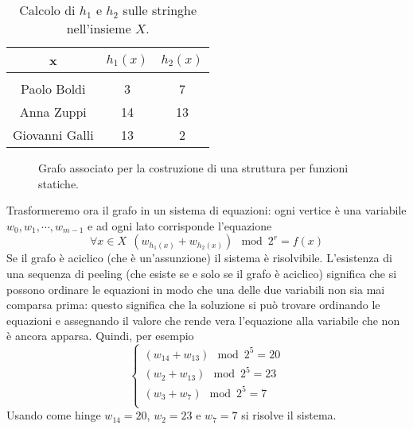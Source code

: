 \begin{table}[htpb]
	\begin{tabular}{c | c | c}
		x              & $h_1(x)$ & $h_2(x)$ \\
		\hline                               \\
		Paolo Boldi    & 3        & 7        \\
		Anna Zuppi     & 14       & 13       \\
		Giovanni Galli & 13       & 2
	\end{tabular}
	\centering
	\caption{Calcolo di $h_1$ e $h_2$ sulle stringhe nell'insieme $X$.}
	\label{tab:static_hashes}
\end{table}
\begin{figure}[htpb]
	\begin{center}

	\end{center}
	\caption{Grafo associato per la costruzione di una struttura per funzioni statiche.}%
	\label{fig:static_graph}
\end{figure}
Trasformeremo ora il grafo in un sistema di equazioni: ogni vertice è una variabile $w_0, w_1, \cdots, w_{m-1}$ e ad ogni lato corrisponde
l'equazione
$$
	\forall x \in X ~~ (w_{h_1(x)} + w_{h_2(x)}) \mod 2^r = f(x)
$$
Se il grafo è aciclico (che è un'assunzione) il sistema è risolvibile. 
L'esistenza di una sequenza di peeling (che esiste se e solo se il grafo è aciclico) significa 
che si possono ordinare le equazioni in modo che una delle due variabili non sia mai 
comparsa prima: questo significa che la soluzione si può trovare ordinando le equazioni
e assegnando il valore che rende vera l'equazione alla variabile che non è ancora apparsa. 
Quindi, per esempio
$$
\begin{cases}
    (w_{14} + w_{13}) \mod 2^5 = 20 \\
    (w_{2} + w_{13}) \mod 2^5 = 23 \\
    (w_{3} + w_{7}) \mod 2^5 = 7 \\
\end{cases}
$$
Usando come hinge $w_{14} = 20$, $w_{2} = 23$ e $w_{7} = 7$ si risolve il sistema. 

